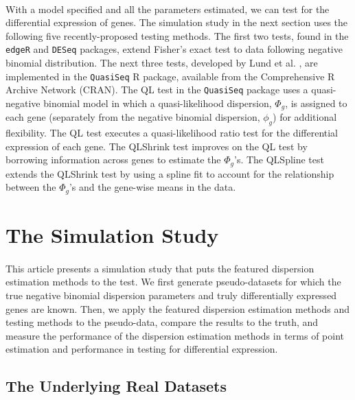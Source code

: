 \documentclass[10pt]{article}
\begin{document}
\paragraph{} \indent With a model specified and all the parameters estimated, we can test for the differential expression of genes. The simulation study in the next section uses the following five recently-proposed testing methods. The first two tests, found in the {\tt edgeR} and {\tt DESeq} packages, extend Fisher's exact test to data following negative binomial distribution. The next three tests, developed by Lund et al. \cite{quasiseq}, are implemented in the {\tt QuasiSeq} R package, available from the Comprehensive R Archive Network (CRAN). The QL test in the {\tt QuasiSeq} package uses a quasi-negative binomial model in which a quasi-likelihood dispersion, $\Phi_g$, is assigned to each gene (separately from the negative binomial dispersion, $\phi_g$) for additional flexibility. The QL test executes a quasi-likelihood ratio test for the differential expression of each gene. The QLShrink test improves on the QL test by borrowing information across genes to estimate the $\Phi_g$'s. The QLSpline test extends the QLShrink test by using a spline fit to account for the relationship between the $\Phi_g$'s and the gene-wise means in the data.









\section*{The Simulation Study}

\paragraph{} \indent This article presents a simulation study that puts the featured dispersion estimation methods to the test. We first generate pseudo-datasets for which the true negative binomial dispersion parameters and truly differentially expressed genes are known. Then, we apply the featured dispersion estimation methods and testing methods to the pseudo-data, compare the results to the truth, and measure the performance of the dispersion estimation methods in terms of point estimation and performance in testing for differential expression. 

\subsection*{The Underlying Real Datasets} \label{sec:thisdata}
\end{document}
